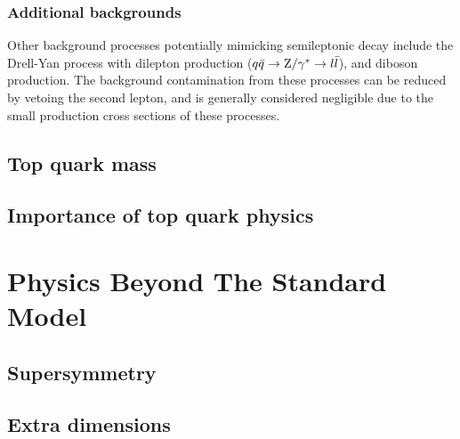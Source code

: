 \subsubsection*{Additional backgrounds}
Other background processes potentially mimicking semileptonic \ttbar decay include the Drell-Yan process with dilepton
production ($q \bar{q} \rightarrow \mathrm{Z}/\gamma^* \rightarrow l \bar{l}$), and diboson production. The background
contamination from these processes can be reduced by vetoing the second lepton, and is generally considered negligible
due to the small production cross sections of these processes.


\subsection{Top quark mass}
\label{ss:top_mass}

\subsection{Importance of top quark physics}
\label{ss:importance}

\section{Physics Beyond The Standard Model}
\label{s:BSM}

\subsection{Supersymmetry}
\label{ss:SUSY}

\subsection{Extra dimensions}
\label{ss:extra_dimensions}


